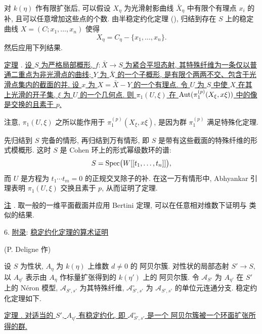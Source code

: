 对 $k(\eta)$ 作有限扩张后, 可以假设 $X_\eta$ 为光滑射影曲线 $\bar X_\eta$ 中有限个有理点 $x_i$ 的补, 且可以任意增加这些点的个数. 由半稳定约化定理 (), 归结到存在 $S$ 上的稳定曲线 $X=(C;x_1,\ldots,x_n)$ 使得
\[
X_\eta=C_\eta-\{x_1,\ldots,x_n\}.
\]
然后应用下列结果.


\underline{定理} . \underline{设 $S$ 为严格局部概形, $f:\bar X\longrightarrow S$ 为紧合平坦态射, 其特殊纤维为一条仅以普通二重点为非光滑点的曲线; $Y$ 为 $\bar X$ 的一个子概形, 是有限个两两不交、包含于光滑点集内的截面的并. 设 $x$ 为 $X=\bar X-Y$ 的一个有理点. 令 $U$ 为 $S$ 中使 $X$ 在其上光滑的开子集, $\xi$ 为 $U$ 的一个几何点. 则 $\pi_1(U,\xi)$ 在 $\operatorname{Aut}(\pi_1^{(p)}(X_\xi,x\xi))$ 中的像是交换的且素于 $p$.}

注意, $\pi_1(U,\xi)$ 之所以能作用于 $\pi_1^{(p)}(X_\xi,x\xi)$, 是因为群 $\pi_1^{(p)}$ 满足特殊化定理.

先归结到 $S$ 完备的情形, 再归结到万有情形, 即 $S$ 是带有这些截面的特殊纤维的形式模概形. 这时 $S$ 是 Cohen 环上的形式幂级数环的谱:
\[
S=\operatorname{Spec}\bigl(W[[t_1,\ldots,t_n]]\bigr),
\]
而 $U$ 是方程为 $t_1\cdots t_m=0$ 的正规交叉除子的补. 在这一万有情形中, Abhyankar 引理表明 $\pi_1(U,\xi)$ 交换且素于 $p$, 从而证明了定理.

\underline{注} . 取一般的一维平面截面并应用 Bertini 定理, 可以在任意相对维数下证明与  类似的结果.



6. \underline{附录}: \underline{稳定约化定理的算术证明}

(P. Deligne 作)

设 $S$ 为性状, $A_\eta$ 为 $k(\eta)$ 上维数 $d\neq 0$ 的 阿贝尔簇. 对性状的局部态射 $S'\longrightarrow S$, 以 $A_{\eta'}$ 表示由 $A_\eta$ 作标量扩张得到的 $k(\eta')$ 上的 阿贝尔簇. 令 $\mathcal A_{S'}$ 为 $A_{\eta'}$ 在 $S'$ 上的 N\'eron 模型, $\mathcal A_{S',s'}$ 为其特殊纤维, $\mathcal A^\circ_{S',s'}$ 为 $\mathcal A_{S',s'}$ 的单位元连通分支. 稳定约化定理如下.


\underline{定理 . 对适当的 $S'$, $A_{\eta'}$ 有稳定约化, 即 $\mathcal A^\circ_{S',s'}$ 是一个 阿贝尔簇被一个环面扩张所得的群.}

